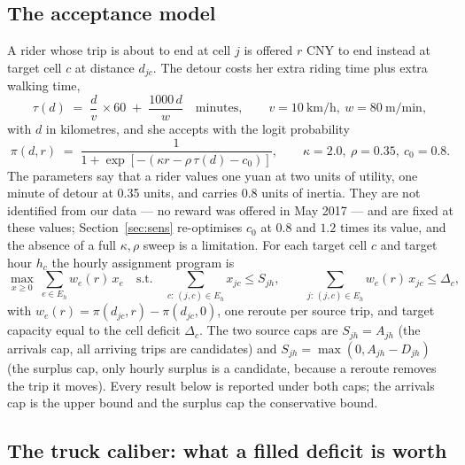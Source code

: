 \subsection{The acceptance model}

A rider whose trip is about to end at cell $j$ is offered $r$ CNY to end instead at
target cell $c$ at distance $d_{jc}$. The detour costs her extra riding time plus extra
walking time,
\begin{equation}
\tau(d) \;=\; \frac{d}{v}\,\times 60 \;+\; \frac{1000\,d}{w}
\quad\text{minutes},\qquad v=10\ \text{km/h},\ w=80\ \text{m/min},
\label{eq:tau}
\end{equation}
with $d$ in kilometres, and she accepts with the logit probability
\begin{equation}
\pi(d,r) \;=\; \frac{1}{1+\exp\left[-\left(\kappa r-\rho\,\tau(d)-c_0\right)\right]},
\qquad \kappa=2.0,\ \rho=0.35,\ c_0=0.8 .
\label{eq:logit}
\end{equation}
The parameters say that a rider values one yuan at two units of utility, one minute of
detour at 0.35 units, and carries 0.8 units of inertia. They are not identified from
our data --- no reward was offered in May 2017 --- and are fixed at these values;
Section~\ref{sec:sens} re-optimises $c_0$ at $0.8$ and $1.2$ times its value, and the
absence of a full $\kappa,\rho$ sweep is a limitation. For each target cell $c$ and target hour $h_c$
the hourly assignment program is
\begin{equation}
\max_{x\ge0}\ \sum_{e\in E_h} w_e(r)\,x_e
\quad\text{s.t.}\quad
\sum_{c:\,(j,c)\in E_h} x_{jc}\le S_{jh},
\qquad
\sum_{j:\,(j,c)\in E_h} w_e(r)\,x_{jc}\le \Delta_c ,
\label{eq:q3lp}
\end{equation}
with $w_e(r)=\pi(d_{jc},r)-\pi(d_{jc},0)$, one reroute per source trip, and target
capacity equal to the cell deficit $\Delta_c$. The two source caps are $S_{jh}=A_{jh}$
(the arrivals cap, all arriving trips are candidates) and
$S_{jh}=\max(0,A_{jh}-D_{jh})$ (the surplus cap, only hourly surplus is a candidate,
because a reroute removes the trip it moves). Every result below is reported under both
caps; the arrivals cap is the upper bound and the surplus cap the conservative bound.

\subsection{The truck caliber: what a filled deficit is worth}

